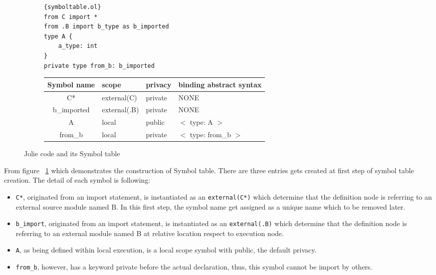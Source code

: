 \begin{figure}[ht]
    \begin{subfigure}[b]{\textwidth}
        \lstset{language=Jolie,
            style=codeStyle,
            numbers=left,
            firstnumber=1
        }
        \begin{lstlisting}[frame=tlrb,
            basicstyle=\footnotesize]{symboltable.ol}
from C import *
from .B import b_type as b_imported
type A {
    a_type: int
}
private type from_b: b_imported
\end{lstlisting}
    \end{subfigure}
    \begin{subfigure}[b]{\textwidth}
        \begin{tabular}{ |c|l|l|l| }
            \hline
            Symbol name & scope        & privacy & binding abstract syntax \\
            \hline
            C*          & external(C)  & private & NONE                    \\
            b_imported  & external(.B) & private & NONE                    \\
            A           & local        & public  & $<$ type: A $>$         \\
            from_b      & local        & private & $<$ type: from_b $>$    \\
            \hline
        \end{tabular}
    \end{subfigure}
    \caption{Jolie code and its Symbol table}
    \label{fig:jolie-ex-symbol-table}
\end{figure}

From figure ~\ref{fig:jolie-ex-symbol-table} which demonstrates the construction of Symbol table.
There are three entries gets created at first step of symbol table creation. The detail of each symbol is following:

\begin{itemize}
    \item \texttt{C*}, originated from an import statement, is instantiated as an \texttt{external(C*)} which determine that the definition node is referring to an external source module named B. In this first step, the symbol name get assigned as a unique name which to be removed later.
    \item \texttt{b_import}, originated from an import statement, is instantiated as an \texttt{external(.B)} which determine that the definition node is referring to an external module named B at relative location respect to execution node.
    \item \texttt{A}, as being defined within local execution, is a local scope symbol with public, the default privacy.
    \item \texttt{from_b}, however, has a keyword private before the actual declaration, thus, this symbol cannot be import by others.
\end{itemize}

